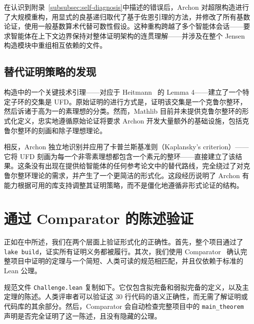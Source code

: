 在认识到附录~\ref{subsubsec:self-diagnosis}中描述的错误后，Archon 对超限构造进行了大规模重构，用显式的良基递归取代了基于佐恩引理的方法，并修改了所有基数论证，使用一般基数算术代替可数性假设。这种重构跨越了多个智能体会话——要求智能体在上下文边界保持对整体证明架构的连贯理解——并涉及在整个 Jensen 构造模块中重组相互依赖的文件。

\subsection{替代证明策略的发现}\label{subsubsec:alternative-strategy}

构造中的一个关键技术引理——对应于 Heitmann~\cite{heitmann1993characterization} 的 Lemma 4——建立了一个特定子环的交集是 UFD。原始证明的进行方式是，证明该交集是一个克鲁尔整环，然后诉诸于高为一的素理想的分类。然而，Mathlib 目前并未提供克鲁尔整环的形式化定义，忠实地遵循原始论证将要求 Archon 开发大量额外的基础设施，包括克鲁尔整环的刻画和除子理想理论。

相反，Archon 独立地识别并应用了卡普兰斯基准则（Kaplansky's criterion）——它将 UFD 刻画为每一个非零素理想都包含一个素元的整环——直接建立了该结果。这条没有出现在提供给智能体的任何参考论文中的替代路线，完全绕过了对克鲁尔整环理论的需求，并产生了一个更简洁的形式化。这段经历说明了 Archon 有能力根据可用的库支持调整其证明策略，而不是僵化地遵循非形式论证的结构。


\section{通过 Comparator 的陈述验证}\label{appendix:szm_comparator}

正如在中所述，我们在两个层面上验证形式化的正确性。首先，整个项目通过了 \texttt{lake build}，证实所有证明义务都被履行。其次，我们使用 Comparator~\cite{comparator} 确认完整项目中证明的定理与一个简短、人类可读的规范相匹配，并且仅依赖于标准的 Lean 公理。

规范文件 \texttt{Challenge.lean} 复制如下。它仅包含拟完备和弱拟完备的定义，以及主定理的陈述。人类评审者可以验证这 30 行代码的语义正确性，而无需了解证明或代码库的其余部分。然后，Comparator 会自动检查完整项目中的 \texttt{main\_theorem} 声明是否完全证明了这一陈述，且没有隐藏的公理。


